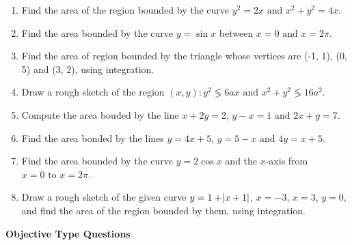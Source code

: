 \documentclass[12pt]{article}
\begin{document}
\begin{enumerate}[resume]
\item Find the area of the region bounded by the curve $y^2 = 2x\text{ and }x^2 + y^2 = 4x$.
\item Find the area bounded by the curve $y = \sin x$ between $x = 0 \text{ and }x = {2\pi}$.
\item Find the area of region bounded by the triangle whose vertices are (-1, 1), (0, 5) and (3, 2), using integration.
\item Draw a rough sketch of the region ${(x, y) : y^2 \lessgtr 6ax\text{ and }x^2 + y^2 \lessgtr 16a^2}$.
\item Compute the area bouded by the line $x + 2y = 2$, $y - x = 1\text{ and }2x + y = 7$.
\item Find the area bonded by the lines $y = 4x + 5$, $y = 5 - x\text{ and }4y = x + 5$.
\item Find the area bounded by the curve $y = 2\cos x$ and the $x$-axis from $x = 0\text{ to }x = {2\pi}$.
\item Draw a  rough sketch of the given curve $y =1 + \abs{x + 1}$, $x = -3$, $x = 3$, $y = 0$, and find the area of the region bounded by them, using integration.
\end{enumerate}
\textbf{Objective Type Questions}
\end{document}
